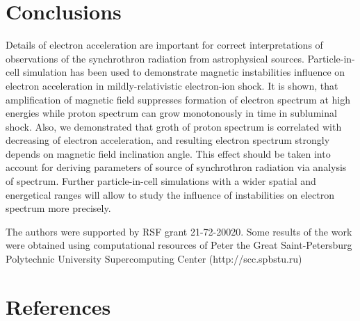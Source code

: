\documentclass[a4paper]{jpconf}
\begin{document}
	
	\section{Conclusions}
	
	Details of electron acceleration are important for correct interpretations of observations of the  synchrothron radiation from astrophysical sources. Particle-in-cell simulation has been used to demonstrate magnetic instabilities influence on electron acceleration in mildly-relativistic electron-ion shock. It is shown, that amplification of magnetic field suppresses formation of electron spectrum at high energies while proton spectrum can grow monotonously in time in subluminal shock. Also, we demonstrated that groth of proton spectrum is correlated with decreasing of electron acceleration, and resulting  electron spectrum strongly depends on magnetic field inclination angle. This effect should be taken into account for deriving parameters of source of synchrothron radiation via analysis of spectrum. Further particle-in-cell simulations with a wider spatial and energetical ranges will allow to study the influence of instabilities on electron spectrum more precisely.
	
	
	\ack
	The authors were supported by RSF grant 21-72-20020.
	Some results of the work were obtained using computational resources of Peter the Great Saint-Petersburg Polytechnic University Supercomputing Center (http://scc.spbstu.ru)
	
	\section*{References}
	

	
\end{document}

